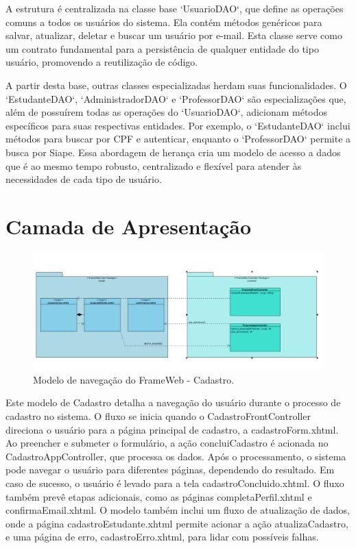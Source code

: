 A estrutura é centralizada na classe base `UsuarioDAO`, que define as operações comuns a todos os usuários do sistema. Ela contém métodos genéricos para salvar, atualizar, deletar e buscar um usuário por e-mail. Esta classe serve como um contrato fundamental para a persistência de qualquer entidade do tipo usuário, promovendo a reutilização de código.

A partir desta base, outras classes especializadas herdam suas funcionalidades. O `EstudanteDAO`, `AdministradorDAO` e `ProfessorDAO` são especializações que, além de possuírem todas as operações do `UsuarioDAO`, adicionam métodos específicos para suas respectivas entidades. Por exemplo, o `EstudanteDAO` inclui métodos para buscar por CPF e autenticar, enquanto o `ProfessorDAO` permite a busca por Siape. Essa abordagem de herança cria um modelo de acesso a dados que é ao mesmo tempo robusto, centralizado e flexível para atender às necessidades de cada tipo de usuário.

\section{Camada de Apresentação}
\label{sec-frameweb-apresentacao}

\begin{figure}[H]
	\centering
	\includegraphics[width=1.0\textwidth]{figuras/figura_modelo_navegacao_cadastro.png}
	\caption{Modelo de navegação do FrameWeb - Cadastro.}
	\label{figura-cadastro}
\end{figure}

Este modelo de Cadastro detalha a navegação do usuário durante o processo de cadastro no sistema. O fluxo se inicia quando o CadastroFrontController direciona o usuário para a página principal de cadastro, a cadastroForm.xhtml. Ao preencher e submeter o formulário, a ação concluiCadastro é acionada no CadastroAppController, que processa os dados. Após o processamento, o sistema pode navegar o usuário para diferentes páginas, dependendo do resultado. Em caso de sucesso, o usuário é levado para a tela cadastroConcluido.xhtml. O fluxo também prevê etapas adicionais, como as páginas completaPerfil.xhtml e confirmaEmail.xhtml. O modelo também inclui um fluxo de atualização de dados, onde a página cadastroEstudante.xhtml permite acionar a ação atualizaCadastro, e uma página de erro, cadastroErro.xhtml, para lidar com possíveis falhas.


